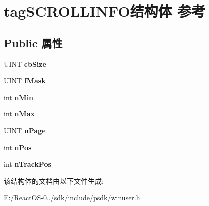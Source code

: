 \hypertarget{structtag_s_c_r_o_l_l_i_n_f_o}{}\section{tag\+S\+C\+R\+O\+L\+L\+I\+N\+F\+O结构体 参考}
\label{structtag_s_c_r_o_l_l_i_n_f_o}
\subsection*{Public 属性}
\begin{DoxyCompactItemize}
\item 
\mbox{\label{structtag_s_c_r_o_l_l_i_n_f_o_a83f5b5018cf26b1192464b3fa7b49327}} 
U\+I\+NT {\bfseries cb\+Size}
\item 
\mbox{\label{structtag_s_c_r_o_l_l_i_n_f_o_ad73bd931d8ca2b935ae5da513d7726f6}} 
U\+I\+NT {\bfseries f\+Mask}
\item 
\mbox{\label{structtag_s_c_r_o_l_l_i_n_f_o_a3e2996be3ea4d18324c9f7b1fa266f73}} 
int {\bfseries n\+Min}
\item 
\mbox{\label{structtag_s_c_r_o_l_l_i_n_f_o_a82e9814b9583b7efb5bcf1da5106699c}} 
int {\bfseries n\+Max}
\item 
\mbox{\label{structtag_s_c_r_o_l_l_i_n_f_o_a0734f0c1997ab47f597fd221a480f628}} 
U\+I\+NT {\bfseries n\+Page}
\item 
\mbox{\label{structtag_s_c_r_o_l_l_i_n_f_o_a2a0407fdff4113fb69fab9fdfee6563a}} 
int {\bfseries n\+Pos}
\item 
\mbox{\label{structtag_s_c_r_o_l_l_i_n_f_o_a434b74498d4a71547ac34b9e258f42e9}} 
int {\bfseries n\+Track\+Pos}
\end{DoxyCompactItemize}


该结构体的文档由以下文件生成\+:\begin{DoxyCompactItemize}
\item 
E\+:/\+React\+O\+S-\/0../sdk/include/psdk/winuser.\+h\end{DoxyCompactItemize}
